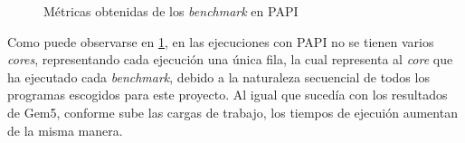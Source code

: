 \begin{figure}[H]
    \centering
    \caption{Métricas obtenidas de los \textit{benchmark} en PAPI}
    \label{fig:tablaMetricasPAPI}
\end{figure}

Como puede observarse en \ref{fig:tablaMetricasPAPI}, en las ejecuciones con PAPI no se tienen varios \textit{cores}, representando cada ejecución una única fila, la cual representa al \textit{core} que ha ejecutado cada \textit{benchmark}, debido a la naturaleza secuencial de todos los programas escogidos para este proyecto. Al igual que sucedía con los resultados de Gem5, conforme sube las cargas de trabajo, los tiempos de ejecuión aumentan de la misma manera. 

